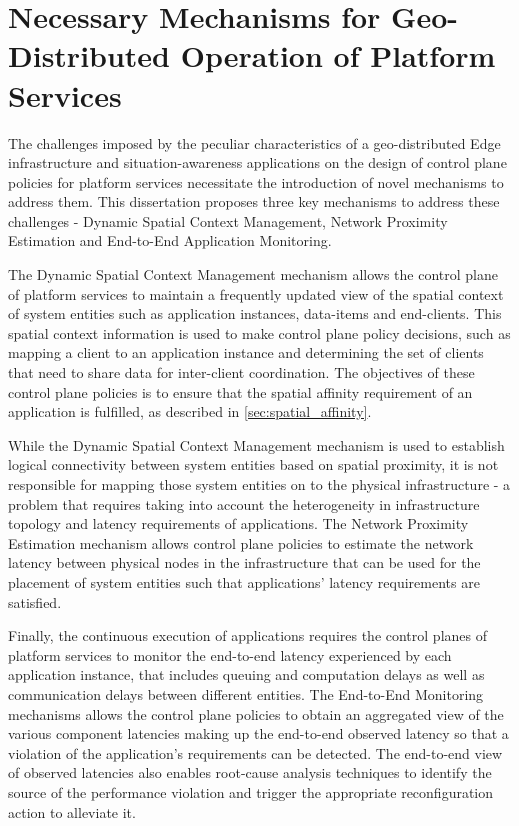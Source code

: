 \chapter{Necessary Mechanisms for Geo-Distributed Operation of Platform Services}

The challenges imposed by the peculiar characteristics of a geo-distributed Edge infrastructure and situation-awareness applications on the design of control plane policies for platform services necessitate the introduction of novel mechanisms to address them. This dissertation proposes three key mechanisms to address these challenges - Dynamic Spatial Context Management, Network Proximity Estimation and End-to-End Application Monitoring. 
\par The Dynamic Spatial Context Management mechanism allows the control plane of platform services to maintain a frequently updated view of the spatial context of system entities such as application instances, data-items and end-clients. This spatial context information is used to make control plane policy decisions, such as mapping a client to an application instance and determining the set of clients that need to share data for inter-client coordination. The objectives of these control plane policies is to ensure that the spatial affinity requirement of an application is fulfilled, as described in \cref{sec:spatial_affinity}.
\par While the Dynamic Spatial Context Management mechanism is used to establish logical connectivity between system entities based on spatial proximity, it is not responsible for mapping those system entities on to the physical infrastructure - a problem that requires taking into account the  heterogeneity in infrastructure topology and latency requirements of applications. The Network Proximity Estimation mechanism allows control plane policies to estimate the network latency between physical nodes in the infrastructure that can be used for the placement of system entities such that applications' latency requirements are satisfied. 
\par Finally, the continuous execution of applications requires the control planes of platform services to monitor the end-to-end latency experienced by each application instance, that includes queuing and computation delays as well as communication delays between different entities. The End-to-End Monitoring mechanisms allows the control plane policies to obtain an aggregated view of the various component latencies making up the end-to-end observed latency so that a violation of the application's requirements can be detected. The end-to-end view of observed latencies also enables root-cause analysis techniques to identify the source of the performance violation and trigger the appropriate reconfiguration action to alleviate it. 
